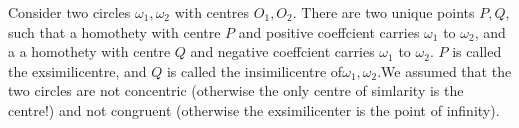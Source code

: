 \documentclass[11pt,a4paper]{article}
\begin{document}
Consider two circles $\omega_1, \omega_2$ with centres $O_1,O_2$. There are two unique points $P,Q$, such that a homothety with centre $P$ and positive coeffcient carries $\omega_1$ to $\omega_2$, and a a homothety with centre $Q$ and negative coeffcient carries $\omega_1$ to $\omega_2$. $P$ is called the exsimilicentre, and $Q$ is called the insimilicentre of$\omega_1, \omega_2$.We assumed that the two circles are not concentric (otherwise the only centre of simlarity is the centre!) and not congruent (otherwise the exsimilicenter is the point of infinity).

\usetikzlibrary{arrows}
\end{document}
